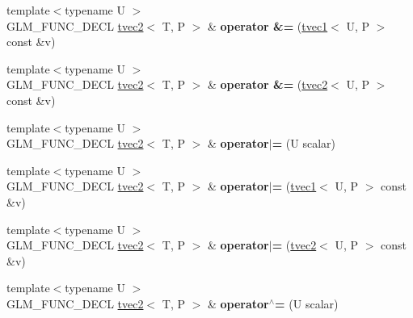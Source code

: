 \begin{DoxyCompactItemize}
{\footnotesize template$<$typename U $>$ }\\G\+L\+M\+\_\+\+F\+U\+N\+C\+\_\+\+D\+E\+CL \hyperlink{structglm_1_1tvec2}{tvec2}$<$ T, P $>$ \& {\bfseries operator \&=} (\hyperlink{structglm_1_1tvec1}{tvec1}$<$ U, P $>$ const \&v)
\item 
\mbox{\label{structglm_1_1tvec2_a91d228f11b8f6cc759d289c2c9bdb3a6}} 
{\footnotesize template$<$typename U $>$ }\\G\+L\+M\+\_\+\+F\+U\+N\+C\+\_\+\+D\+E\+CL \hyperlink{structglm_1_1tvec2}{tvec2}$<$ T, P $>$ \& {\bfseries operator \&=} (\hyperlink{structglm_1_1tvec2}{tvec2}$<$ U, P $>$ const \&v)
\item 
\mbox{\label{structglm_1_1tvec2_a4992709adc592f1790beedc60d2089cd}} 
{\footnotesize template$<$typename U $>$ }\\G\+L\+M\+\_\+\+F\+U\+N\+C\+\_\+\+D\+E\+CL \hyperlink{structglm_1_1tvec2}{tvec2}$<$ T, P $>$ \& {\bfseries operator$\vert$=} (U scalar)
\item 
\mbox{\label{structglm_1_1tvec2_a4cb8e942400c0ea18beb292a50c49958}} 
{\footnotesize template$<$typename U $>$ }\\G\+L\+M\+\_\+\+F\+U\+N\+C\+\_\+\+D\+E\+CL \hyperlink{structglm_1_1tvec2}{tvec2}$<$ T, P $>$ \& {\bfseries operator$\vert$=} (\hyperlink{structglm_1_1tvec1}{tvec1}$<$ U, P $>$ const \&v)
\item 
\mbox{\label{structglm_1_1tvec2_a2bb8b0876df3f551acf4dae3134e0d2e}} 
{\footnotesize template$<$typename U $>$ }\\G\+L\+M\+\_\+\+F\+U\+N\+C\+\_\+\+D\+E\+CL \hyperlink{structglm_1_1tvec2}{tvec2}$<$ T, P $>$ \& {\bfseries operator$\vert$=} (\hyperlink{structglm_1_1tvec2}{tvec2}$<$ U, P $>$ const \&v)
\item 
\mbox{\label{structglm_1_1tvec2_af338fe1420da86c655cb368cb8739667}} 
{\footnotesize template$<$typename U $>$ }\\G\+L\+M\+\_\+\+F\+U\+N\+C\+\_\+\+D\+E\+CL \hyperlink{structglm_1_1tvec2}{tvec2}$<$ T, P $>$ \& {\bfseries operator$^\wedge$=} (U scalar)
\item 
\mbox{\label{structglm_1_1tvec2_a50b26c0a009d0ed134ae0984da6d50ab}} 

\end{DoxyCompactItemize}
